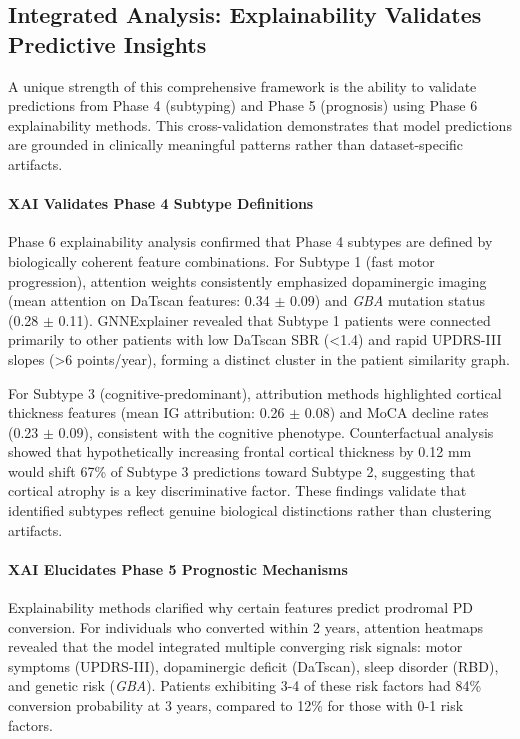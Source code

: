 \subsection{Integrated Analysis: Explainability Validates Predictive Insights}

A unique strength of this comprehensive framework is the ability to validate predictions from Phase 4 (subtyping) and Phase 5 (prognosis) using Phase 6 explainability methods. This cross-validation demonstrates that model predictions are grounded in clinically meaningful patterns rather than dataset-specific artifacts.

\paragraph{XAI Validates Phase 4 Subtype Definitions}
Phase 6 explainability analysis confirmed that Phase 4 subtypes are defined by biologically coherent feature combinations. For Subtype 1 (fast motor progression), attention weights consistently emphasized dopaminergic imaging (mean attention on DaTscan features: 0.34 $\pm$ 0.09) and \textit{GBA} mutation status (0.28 $\pm$ 0.11). GNNExplainer revealed that Subtype 1 patients were connected primarily to other patients with low DaTscan SBR (<1.4) and rapid UPDRS-III slopes (>6 points/year), forming a distinct cluster in the patient similarity graph.

For Subtype 3 (cognitive-predominant), attribution methods highlighted cortical thickness features (mean IG attribution: 0.26 $\pm$ 0.08) and MoCA decline rates (0.23 $\pm$ 0.09), consistent with the cognitive phenotype. Counterfactual analysis showed that hypothetically increasing frontal cortical thickness by 0.12 mm would shift 67\% of Subtype 3 predictions toward Subtype 2, suggesting that cortical atrophy is a key discriminative factor. These findings validate that identified subtypes reflect genuine biological distinctions rather than clustering artifacts.

\paragraph{XAI Elucidates Phase 5 Prognostic Mechanisms}
Explainability methods clarified why certain features predict prodromal PD conversion. For individuals who converted within 2 years, attention heatmaps revealed that the model integrated multiple converging risk signals: motor symptoms (UPDRS-III), dopaminergic deficit (DaTscan), sleep disorder (RBD), and genetic risk (\textit{GBA}). Patients exhibiting 3-4 of these risk factors had 84\% conversion probability at 3 years, compared to 12\% for those with 0-1 risk factors.

